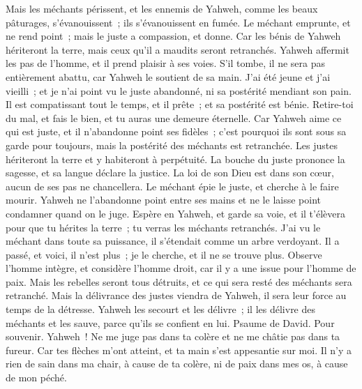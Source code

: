 \begin{multicols}{2}
 Mais les méchants périssent, et les ennemis de Yahweh, comme les beaux pâturages, s'évanouissent~; ils s'évanouissent en fumée.
 Le méchant emprunte, et ne rend point~; mais le juste a compassion, et donne.
Car les bénis de Yahweh hériteront la terre, mais ceux qu'il a maudits seront retranchés.
 Yahweh affermit les pas de l'homme, et il prend plaisir à ses voies.
S'il tombe, il ne sera pas entièrement abattu, car Yahweh le soutient de sa main.
 J'ai été jeune et j'ai vieilli~; et je n'ai point vu le juste abandonné, ni sa postérité mendiant son pain.
Il est compatissant tout le temps, et il prête~; et sa postérité est bénie.
 Retire-toi du mal, et fais le bien, et tu auras une demeure éternelle.
Car Yahweh aime ce qui est juste, et il n'abandonne point ses fidèles~; c'est pourquoi ils sont sous sa garde pour toujours, mais la postérité des méchants est retranchée.
 Les justes hériteront la terre et y habiteront à perpétuité.
 La bouche du juste prononce la sagesse, et sa langue déclare la justice.
La loi de son Dieu est dans son cœur, aucun de ses pas ne chancellera.
 Le méchant épie le juste, et cherche à le faire mourir.
Yahweh ne l'abandonne point entre ses mains et ne le laisse point condamner quand on le juge.
 Espère en Yahweh, et garde sa voie, et il t'élèvera pour que tu hérites la terre~; tu verras les méchants retranchés.
 J'ai vu le méchant dans toute sa puissance, il s'étendait comme un arbre verdoyant.
Il a passé, et voici, il n'est plus~; je le cherche, et il ne se trouve plus.
 Observe l'homme intègre, et considère l'homme droit, car il y a une issue pour l'homme de paix.
Mais les rebelles seront tous détruits, et ce qui sera resté des méchants sera retranché.
 Mais la délivrance des justes viendra de Yahweh, il sera leur force au temps de la détresse.
Yahweh les secourt et les délivre~; il les délivre des méchants et les sauve, parce qu'ils se confient en lui.
\VerseOne{}Psaume de David. Pour souvenir.
Yahweh~! Ne me juge pas dans ta colère et ne me châtie pas dans ta fureur.
Car tes flèches m'ont atteint, et ta main s'est appesantie sur moi.
Il n'y a rien de sain dans ma chair, à cause de ta colère, ni de paix dans mes os, à cause de mon péché.

\end{multicols}
